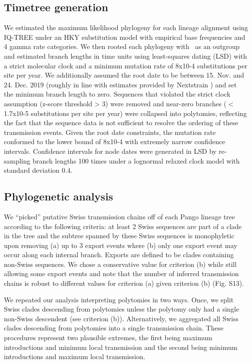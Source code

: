 \documentclass[9pt,twoside,lineno]{pnas-new} %
\begin{document}
\subsection*{Timetree generation}
We estimated the maximum likelihood phylogeny for each lineage alignment using IQ-TREE \cite{Nguyen2014} under an HKY substitution model \cite{Hasegawa1985} with empirical base frequencies and 4 gamma rate categories. We then rooted each phylogeny with \outgroupgisaidepiisls\ as an outgroup and estimated branch lengths in time units using least-squares dating (LSD) \cite{To2016} with a strict molecular clock and a minimum mutation rate of 8x10-4 substitutions per site per year. We additionally assumed the root date to be between 15. Nov. and 24. Dec. 2019 (roughly in line with estimates provided by Nextstrain \cite{Nextstrainteam}) and set the minimum branch length to zero. Sequences that violated the strict clock assumption (z-score threshold > 3) were removed and near-zero branches ($<$1.7x10-5 substitutions per site per year) were collapsed into polytomies, reflecting the fact that the sequence data is not sufficient to resolve the ordering of these transmission events. Given the root date constraints, the mutation rate conformed to the lower bound of 8x10-4 with extremely narrow confidence intervals. Confidence intervals for node dates were generated in LSD by re- sampling branch lengths 100 times under a lognormal relaxed clock model with standard deviation 0.4.

\subsection*{Phylogenetic analysis}
We ``picked'' putative Swiss transmission chains off of each Pango lineage tree according to the following criteria: at least 2 Swiss sequences are part of a clade in the tree and the subtree spanned by these Swiss sequences is monophyletic upon removing (a) up to 3 export events where (b) only one export event may occur along each internal branch. Exports are defined to be clades containing non-Swiss sequences. We chose a conservative value for criterion (b) while still allowing some export events and note that the number of inferred transmission chains is robust to different values for criterion (a) given criterion (b) (Fig. S13).

We repeated our analysis interpreting polytomies in two ways. Once, we split Swiss clades descending from polytomies unless the polytomy only had a single non-Swiss descendent (see criterion (b)). Alternatively, we aggregated all Swiss clades descending from polytomies into a single transmission chain. These procedures represent two plausible extremes, the first being maximum introductions and minimum local transmission and the second being minimum introductions and maximum local transmission.
\end{document}
